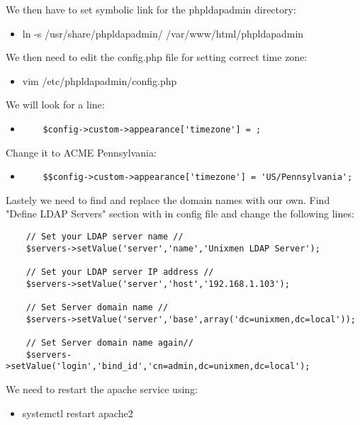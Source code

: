 \noindent We then have to set symbolic link for the phpldapadmin directory:

\begin{itemize}
	\item ln -s /usr/share/phpldapadmin/ /var/www/html/phpldapadmin
\end{itemize}

\noindent We then need to edit the config.php file for setting correct time 
zone:

\begin{itemize}
	\item vim /etc/phpldapadmin/config.php
\end{itemize}

\noindent We will look for a line: 
\begin{itemize}
	\item \begin{verbatim}
	$config->custom->appearance['timezone'] = ;
	\end{verbatim} 
\end{itemize} 

\noindent Change it to ACME Pennsylvania: 
\begin{itemize}
	\item \begin{verbatim}
	$$config->custom->appearance['timezone'] = 'US/Pennsylvania';
	\end{verbatim}
\end{itemize}

\noindent Lastely we need to find and replace the domain names with our own. 
Find "Define LDAP Servers" section with in config file and 
change the following lines:
\begin{verbatim}
	// Set your LDAP server name //
	$servers->setValue('server','name','Unixmen LDAP Server');
	
	// Set your LDAP server IP address // 
	$servers->setValue('server','host','192.168.1.103');
	
	// Set Server domain name //
	$servers->setValue('server','base',array('dc=unixmen,dc=local'));
	
	// Set Server domain name again//
	$servers->setValue('login','bind_id','cn=admin,dc=unixmen,dc=local');
\end{verbatim}

\noindent We need to restart the apache service using:
\begin{itemize}
	\item systemctl restart apache2
\end{itemize}

